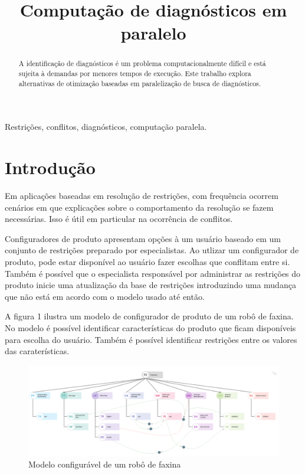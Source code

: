 \documentclass[conference]{IEEEtran}
\begin{document}
\title{Computação de diagnósticos em paralelo\\
}

\author{
}

\maketitle

\begin{abstract}
A identificação de diagnósticos é um problema computacionalmente difícil e está sujeita à demandas por menores tempos de execução. Este trabalho explora alternativas de otimização baseadas em paralelização de busca de diagnósticos.
\end{abstract}

\begin{IEEEkeywords}
Restrições, conflitos, diagnósticos, computação paralela.
\end{IEEEkeywords}

\section{Introdução}

Em aplicações baseadas em resolução de restrições, com frequência ocorrem cenários em que explicações sobre o comportamento da resolução se fazem necessárias. Isso é útil em particular na ocorrência de conflitos.

Configuradores de produto apresentam opções à um usuário baseado em um conjunto de restrições preparado por especialistas. Ao utlizar um configurador de produto, pode estar disponível ao usuário fazer escolhas que conflitam entre si. Também é possível que o especialista responsável por administrar as restrições do produto inicie uma atualização da base de restrições introduzindo uma mudança que não está em acordo com o modelo usado até então.

A figura 1 ilustra um modelo de configurador de produto de um robô de faxina. No modelo é possível identificar características do produto que ficam disponíveis para escolha do usuário. Também é possível identificar restrições entre os valores das caraterísticas.

\begin{figure}[htbp]
\centerline{\includegraphics[width=1\columnwidth]{model.png}}
\caption{Modelo configurável de um robô de faxina} 
\label{fig}
\end{figure}
\end{document}

